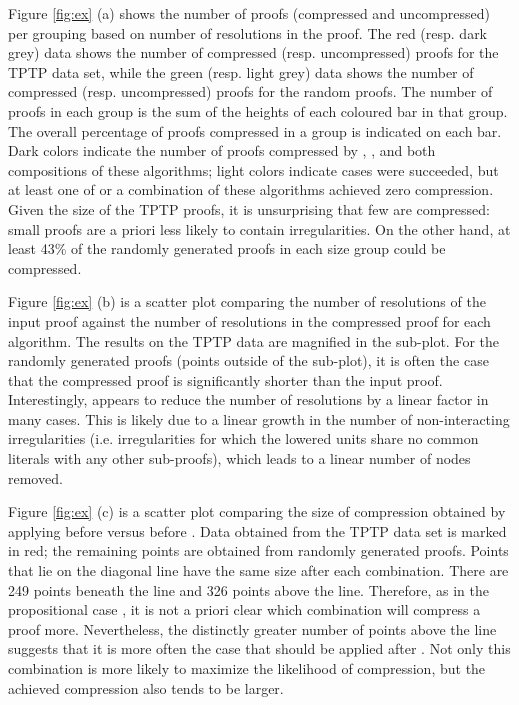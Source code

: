 Figure \ref{fig:ex} (a) shows the number of proofs (compressed and uncompressed) per grouping based on number of resolutions in the proof. 
The red (resp. dark grey) data shows the number of compressed (resp. uncompressed) proofs for the TPTP data set, while the green (resp. light grey) data shows the number of compressed (resp. uncompressed) proofs for the random proofs. 
The number of proofs in each group is the sum of the heights of each coloured bar in that group. The overall percentage of proofs compressed in a group is indicated on each bar. 
Dark colors indicate the number of proofs compressed by {\FORPI}, {\GFOLU}, and both compositions of these algorithms; light colors indicate cases were {\FORPI} succeeded, but at least one of {\GFOLU} or a combination of these algorithms achieved zero compression. 
Given the size of the TPTP proofs, it is unsurprising that few are compressed: small proofs are a priori less likely to contain irregularities. On the other hand, 
at least 43\% of the randomly generated proofs in each size group could be compressed.

Figure \ref{fig:ex} (b) is a scatter plot comparing the number of resolutions of the input proof against the number of resolutions in the compressed proof for each algorithm. 
The results on the TPTP data are magnified in the sub-plot. 
For the randomly generated proofs (points outside of the sub-plot), it is often the case that the compressed proof is significantly shorter than the input proof. Interestingly, {\GFOLU} appears to reduce the number of resolutions by a linear factor in many cases. 
This is likely due to a linear growth in the number of non-interacting irregularities (i.e. irregularities for which the lowered units share no common literals with any other sub-proofs), which leads to a linear number of nodes removed.

Figure \ref{fig:ex} (c) is a scatter plot comparing the size of compression obtained by applying {\FORPI} before {\GFOLU} versus {\GFOLU} before {\FORPI}. 
Data obtained from the TPTP data set is marked in red; the remaining points are obtained from randomly generated proofs. 
Points that lie on the diagonal line have the same size after each combination. 
There are 249 points beneath the line and 326 points above the line. Therefore, as in the propositional case \cite{LURPI}, it is not a priori clear which combination will compress a proof more. 
Nevertheless, the distinctly greater number of points above the line suggests that it is more often the case that {\FORPI} should be applied after {\GFOLU}. 
Not only this combination is more likely to maximize the likelihood of compression, but the achieved compression also tends to be larger.


